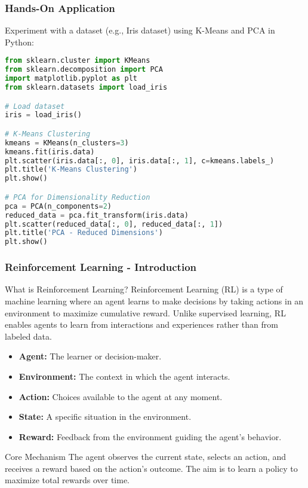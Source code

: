 \documentclass[aspectratio=169]{beamer}
\begin{document}
\begin{frame}[fragile]
    \frametitle{Hands-On Application}
    Experiment with a dataset (e.g., Iris dataset) using K-Means and PCA in Python:

    \begin{lstlisting}[language=Python]
from sklearn.cluster import KMeans
from sklearn.decomposition import PCA
import matplotlib.pyplot as plt
from sklearn.datasets import load_iris

# Load dataset
iris = load_iris()

# K-Means Clustering
kmeans = KMeans(n_clusters=3)
kmeans.fit(iris.data)
plt.scatter(iris.data[:, 0], iris.data[:, 1], c=kmeans.labels_)
plt.title('K-Means Clustering')
plt.show()

# PCA for Dimensionality Reduction
pca = PCA(n_components=2)
reduced_data = pca.fit_transform(iris.data)
plt.scatter(reduced_data[:, 0], reduced_data[:, 1])
plt.title('PCA - Reduced Dimensions')
plt.show()
    \end{lstlisting}
\end{frame}

\begin{frame}[fragile]
    \frametitle{Reinforcement Learning - Introduction}
    \begin{block}{What is Reinforcement Learning?}
        Reinforcement Learning (RL) is a type of machine learning where an agent learns to make decisions by taking actions in an environment to maximize cumulative reward. Unlike supervised learning, RL enables agents to learn from interactions and experiences rather than from labeled data.
    \end{block}
    
    \begin{itemize}
        \item \textbf{Agent:} The learner or decision-maker.
        \item \textbf{Environment:} The context in which the agent interacts.
        \item \textbf{Action:} Choices available to the agent at any moment.
        \item \textbf{State:} A specific situation in the environment.
        \item \textbf{Reward:} Feedback from the environment guiding the agent's behavior.
    \end{itemize}
    
    \begin{block}{Core Mechanism}
        The agent observes the current state, selects an action, and receives a reward based on the action’s outcome. The aim is to learn a policy to maximize total rewards over time.
    \end{block}
\end{frame}
\end{document}
